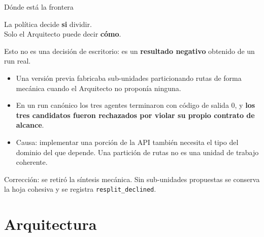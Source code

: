 \documentclass[10pt,aspectratio=169]{beamer}
\begin{document}
\begin{frame}{Dónde está la frontera}
  \begin{center}
    \large
    La política decide \textbf{si} dividir.\\[0.6em]
    Solo el Arquitecto puede decir \textbf{cómo}.
  \end{center}

  \bigskip
  \pause
  Esto no es una decisión de escritorio: es un \textbf{resultado negativo}
  obtenido de un run real.

  \begin{itemize}
    \item Una versión previa fabricaba sub-unidades particionando rutas de
      forma mecánica cuando el Arquitecto no proponía ninguna.
    \item En un run canónico los tres agentes terminaron con código de salida
      0, y \textbf{los tres candidatos fueron rechazados por violar su propio
      contrato de alcance}.
    \item Causa: implementar una porción de la API también necesita el tipo del
      dominio del que depende. Una partición de rutas no es una unidad de
      trabajo coherente.
  \end{itemize}

  \pause
  \bigskip
  Corrección: se retiró la síntesis mecánica. Sin sub-unidades propuestas se
  conserva la hoja cohesiva y se registra \texttt{resplit\_declined}.
\end{frame}

\section{Arquitectura}
\end{document}
